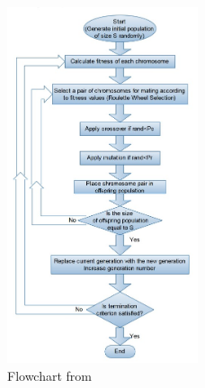 \begin{figure}[h]
	\centering
	\includegraphics[width=0.5\textwidth]{figures/flowchart.jpg}
	\caption{Flowchart from \cite{tartan2016flow}}
	\label{fig:flowchart}
\end{figure}
